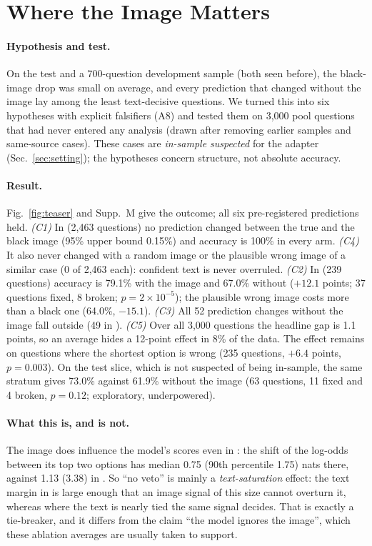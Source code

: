 \section{Where the Image Matters}
\label{sec:image}

\paragraph{Hypothesis and test.}
On the test and a 700-question development sample (both seen before), the black-image drop was small on average, and every prediction that changed without the image lay among the least text-decisive questions.
We turned this into six hypotheses with explicit falsifiers (A8) and tested them on 3{,}000 pool questions that had never entered any analysis (drawn after removing earlier samples and same-source cases).
These cases are \emph{in-sample suspected} for the adapter (Sec.~\ref{sec:setting}); the hypotheses concern structure, not absolute accuracy.

\paragraph{Result.}
Fig.~\ref{fig:teaser} and Supp.~M give the outcome; all six pre-registered predictions held.
\emph{(C1)} In \HI{} (2{,}463 questions) no prediction changed between the true and the black image (95\% upper bound 0.15\%) and accuracy is 100\% in every arm.
\emph{(C4)} It also never changed with a random image or the plausible wrong image of a similar case (0 of 2{,}463 each): confident text is never overruled.
\emph{(C2)} In \LO{} (239 questions) accuracy is 79.1\% with the image and 67.0\% without ($+12.1$ points; 37 questions fixed, 8 broken; $p=2\times10^{-5}$); the plausible wrong image costs more than a black one (64.0\%, $-15.1$).
\emph{(C3)} All 52 prediction changes without the image fall outside \HI{} (49 in \LO{}).
\emph{(C5)} Over all 3{,}000 questions the headline gap is 1.1 points, so an average hides a 12-point effect in 8\% of the data.
The effect remains on questions where the shortest option is wrong (235 questions, $+6.4$ points, $p=0.003$).
On the test slice, which is not suspected of being in-sample, the same stratum gives 73.0\% against 61.9\% without the image (63 questions, 11 fixed and 4 broken, $p=0.12$; exploratory, underpowered).

\paragraph{What this is, and is not.}
The image does influence the model's scores even in \HI{}: the shift of the log-odds between its top two options has median 0.75 (90th percentile 1.75) nats there, against 1.13 (3.38) in \LO{}.
So ``no veto'' is mainly a \emph{text-saturation} effect: the text margin in \HI{} is large enough that an image signal of this size cannot overturn it, whereas where the text is nearly tied the same signal decides.
That is exactly a tie-breaker, and it differs from the claim ``the model ignores the image'', which these ablation averages are usually taken to support.
